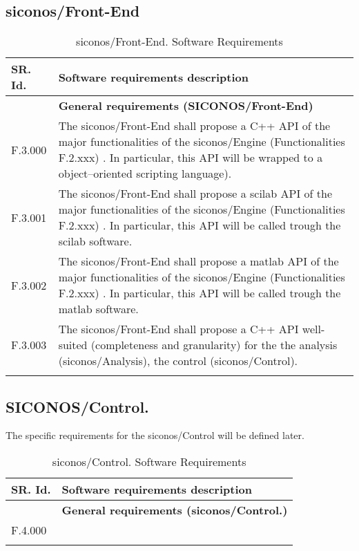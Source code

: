 \subsection{\ac{siconos}/Front-End}
\begin{longtable}{%
|>{\columncolor[gray]{.8}}p{}%
|>{\columncolor[gray]{.95}}p{}|}
\hline
\rowcolor[gray]{.8}   SR. Id. & Software requirements description \\
\hline 
   & \textbf{ General requirements (SICONOS/Front-End)}\\
   \hline
   F.3.000 & The \ac{siconos}/Front-End shall propose a C++  API  of the major functionalities of the \ac{siconos}/Engine (Functionalities F.2.xxx)  . In particular, this API will be wrapped to a object--oriented scripting language). \\
   F.3.001 & The \ac{siconos}/Front-End shall propose a \ac{scilab}  API  of the major functionalities of the \ac{siconos}/Engine (Functionalities F.2.xxx)  . In particular, this API will be  called trough the \ac{scilab} software. \\ 
   F.3.002 & The \ac{siconos}/Front-End shall propose a \ac{matlab}  API  of the major functionalities of the \ac{siconos}/Engine (Functionalities F.2.xxx)  . In particular, this API will be  called trough the \ac{matlab} software. \\
   F.3.003 & The \ac{siconos}/Front-End shall propose a C++  API well-suited (completeness and granularity) for the the analysis (\ac{siconos}/Analysis), the control (\ac{siconos}/Control).    \\
\hline
\caption{\ac{siconos}/Front-End. Software Requirements}\\
\end{longtable}
\subsection{SICONOS/Control.}

The specific requirements for the \ac{siconos}/Control will be defined later. 
\begin{longtable}{%
|>{\columncolor[gray]{.8}}p{}%
|>{\columncolor[gray]{.95}}p{}|}
\hline
\rowcolor[gray]{.8}   SR. Id. & Software requirements description \\
\hline 
   & \textbf{ General requirements (\ac{siconos}/Control.)}\\
   \hline
   F.4.000 & \\
\hline
\caption{\ac{siconos}/Control. Software Requirements}\\
\end{longtable}
